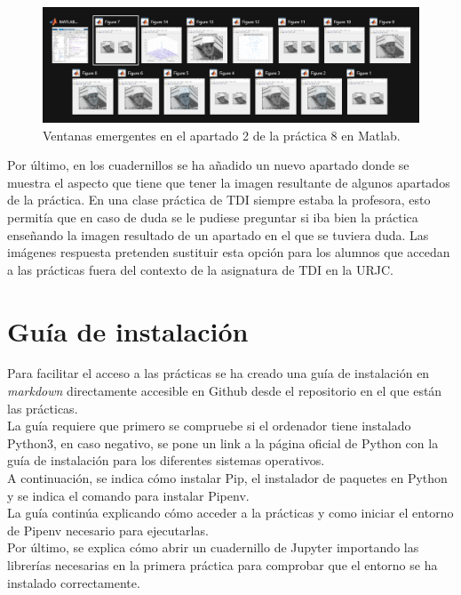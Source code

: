 \begin{figure}[h]
\centering
\includegraphics[width=1\textwidth]{imagenes/ventanas}
\caption{Ventanas emergentes en el apartado 2 de la práctica 8 en Matlab.}
\label{ventanas}
\end{figure}

Por último, en los cuadernillos se ha añadido un nuevo apartado donde se muestra el aspecto que tiene que tener la imagen resultante de algunos apartados de la práctica. En una clase práctica de TDI siempre estaba la profesora, esto permitía que en caso de duda se le pudiese preguntar si iba bien la práctica enseñando la imagen resultado de un apartado en el que se tuviera duda. Las imágenes respuesta pretenden sustituir esta opción para los alumnos que accedan a las prácticas fuera del contexto de la asignatura de TDI en la URJC.


\section{Guía de instalación}

Para facilitar el acceso a las prácticas se ha creado una guía de instalación en \emph{markdown} directamente accesible en Github desde el repositorio en el que están las prácticas.\\

La guía requiere que primero se compruebe si el ordenador tiene instalado Python3, en caso negativo, se pone un link a la página oficial de Python con la guía de instalación para los diferentes sistemas operativos.\\

A continuación, se indica cómo instalar Pip, el instalador de paquetes en Python y se indica el comando para instalar Pipenv.\\

La guía continúa explicando cómo acceder a la prácticas y como iniciar el entorno de Pipenv necesario para ejecutarlas.\\

Por último, se explica cómo abrir un cuadernillo de Jupyter importando las librerías necesarias en la primera práctica para comprobar que el entorno se ha instalado correctamente.\\

